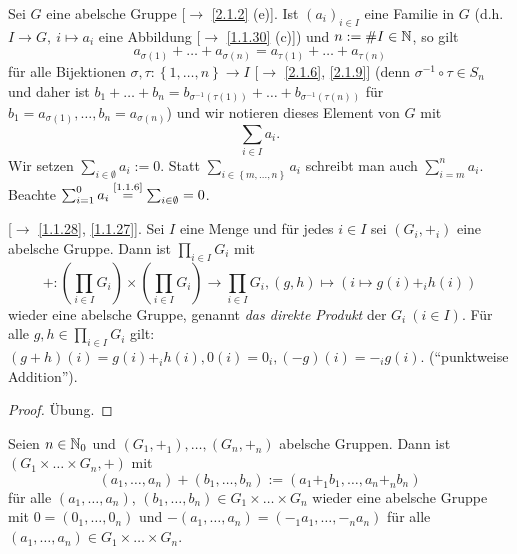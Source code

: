 \documentclass[../../main.tex]{subfiles}
\begin{document}
\begin{nt}\label{2.1.10}
Sei $G$ eine abelsche Gruppe [$\to$ \ref{2.1.2} (e)]. Ist $(a_i)_{i\in I}$ eine Familie in $G$
(d.h. $I\to G,\ i\mapsto a_i$ eine Abbildung [$\to$ \ref{1.1.30} (c)])
und $n:=\# I\in\mathbb N$, so gilt \[a_{\sigma(1)}+\ldots+a_{\sigma(n)} = a_{\tau(1)}+\ldots+a_{\tau(n)}\] für alle Bijektionen $\sigma, \tau:\left\{1,\ldots,n\right\}\rightarrow I$ [$\rightarrow$ \ref{2.1.6}, \ref{2.1.9}] (denn $\sigma^{-1}\circ \tau \in S_n$ und daher ist $b_1+\ldots+b_n=b_{\sigma^{-1}(\tau(1))}+\ldots+b_{\sigma^{-1}(\tau(n))}$ für $b_1 = a_{\sigma(1)},\ldots,b_n = a_{\sigma(n)}$) und wir notieren dieses Element von $G$ mit \[\sum_{i\in I} a_i.\] Wir setzen $\sum_{i\in\emptyset} a_i := 0$. Statt $\sum_{i\in\left\{m,\ldots,n\right\}} a_i$ schreibt man auch $\sum_{i=m}^n a_i$. Beachte $\sum_{i=1}^0 a_i\overset{\text{\ref{1.1.6}}}=\sum_{i\in\emptyset} = 0$.
\end{nt}

\begin{satdef}\label{2.1.11}
{\rm[$\rightarrow$ \ref{1.1.28}, \ref{1.1.27}]}. Sei $I$ eine Menge und für jedes $i\in I$ sei $(G_i,+_i)$ eine abelsche Gruppe. Dann ist $\prod_{i\in I} G_i$ mit
$$+:\left(\prod_{i\in I}G_i\right)\times\left(\prod_{i\in I}G_i\right)\rightarrow\prod_{i\in I}G_i, (g,h)\mapsto (i\mapsto g(i)+_ih(i))$$
wieder eine abelsche Gruppe, genannt \emph{das direkte Produkt} der $G_i ~(i\in I)$. Für alle $g,h\in\prod_{i\in I}G_i$ gilt: $(g+h)(i)=g(i)+_i h(i), 0(i)=0_i, (-g)(i)=-_i g(i)$. ("`punktweise Addition"').
\end{satdef}
\begin{proof}
Übung.
\end{proof}

\begin{kor}\label{2.1.12}
Seien $n\in\mathbb N_0$ und $(G_1,+_1),\ldots,(G_n,+_n)$ abelsche Gruppen. Dann ist $(G_1\times\ldots\times G_n,+)$ mit
\[(a_1,\ldots,a_n)+(b_1,\ldots,b_n):=(a_1+_1b_1,\ldots,a_n+_nb_n)\] für alle $(a_1,\ldots,a_n)$, $(b_1,\ldots,b_n)\in G_1\times\ldots\times G_n$ wieder eine abelsche Gruppe mit $0=(0_1,\ldots,0_n)$ und $-(a_1,\ldots,a_n)=(-_1a_1,\ldots,-_na_n)$ für alle $(a_1,\ldots,a_n)\in G_1\times \ldots\times G_n$.
\end{kor}
\end{document}
